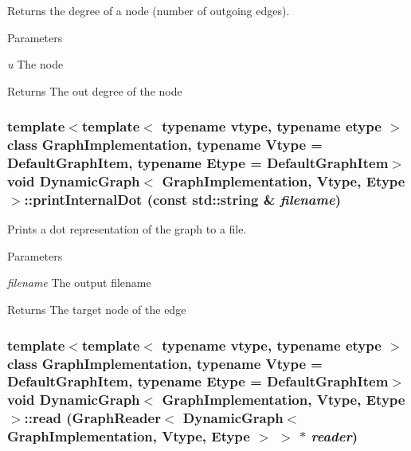Returns the degree of a node (number of outgoing edges). 


\begin{DoxyParams}{Parameters}
\item[{\em u}]The node \end{DoxyParams}
\begin{DoxyReturn}{Returns}
The out degree of the node 
\end{DoxyReturn}
\hypertarget{class_dynamic_graph_aa854b347bbc9bacc14c916831f7f8da3}{
\subsubsection[{printInternalDot}]{\setlength{\rightskip}{0pt plus 5cm}template$<$template$<$ typename vtype, typename etype $>$ class GraphImplementation, typename Vtype  = DefaultGraphItem, typename Etype  = DefaultGraphItem$>$ void {\bf DynamicGraph}$<$ GraphImplementation, Vtype, Etype $>$::printInternalDot (const std::string \& {\em filename})}}
\label{class_dynamic_graph_aa854b347bbc9bacc14c916831f7f8da3}


Prints a dot representation of the graph to a file. 


\begin{DoxyParams}{Parameters}
\item[{\em filename}]The output filename \end{DoxyParams}
\begin{DoxyReturn}{Returns}
The target node of the edge 
\end{DoxyReturn}
\hypertarget{class_dynamic_graph_a3c4f4aef60a6c59ca84d266525f8efda}{
\subsubsection[{read}]{\setlength{\rightskip}{0pt plus 5cm}template$<$template$<$ typename vtype, typename etype $>$ class GraphImplementation, typename Vtype  = DefaultGraphItem, typename Etype  = DefaultGraphItem$>$ void {\bf DynamicGraph}$<$ GraphImplementation, Vtype, Etype $>$::read (GraphReader$<$ {\bf DynamicGraph}$<$ GraphImplementation, Vtype, Etype $>$ $>$ $\ast$ {\em reader})}}
\label{class_dynamic_graph_a3c4f4aef60a6c59ca84d266525f8efda}


